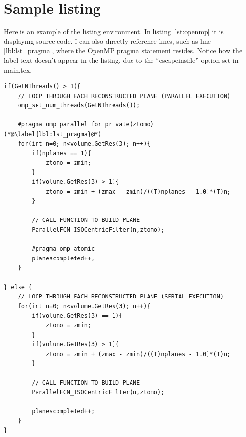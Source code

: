\documentclass[12pt, letterpaper]{article}
\begin{document}
\newpage
\section{Sample listing}

Here is an example of the listing environment.  In listing \ref{lst:openmp} it
is displaying source code.  I can also directly-reference lines, such as line
\ref{lbl:lst_pragma}, where the OpenMP pragma statement resides.  Notice how the
label text doesn't appear in the listing, due to the ``escapeinside'' option set
in main.tex.

\begin{lstlisting}[caption=Implementation of OpenMP in the reconstructioncode code,label=lst:openmp]
if(GetNThreads() > 1){
	// LOOP THROUGH EACH RECONSTRUCTED PLANE (PARALLEL EXECUTION)
	omp_set_num_threads(GetNThreads());

	#pragma omp parallel for private(ztomo) (*@\label{lbl:lst_pragma}@*)
	for(int n=0; n<volume.GetRes(3); n++){
		if(nplanes == 1){
			ztomo = zmin;
		}
		if(volume.GetRes(3) > 1){
			ztomo = zmin + (zmax - zmin)/((T)nplanes - 1.0)*(T)n;
		}

		// CALL FUNCTION TO BUILD PLANE
		ParallelFCN_ISOCentricFilter(n,ztomo);

		#pragma omp atomic
		planescompleted++;
	}

} else {
	// LOOP THROUGH EACH RECONSTRUCTED PLANE (SERIAL EXECUTION)
	for(int n=0; n<volume.GetRes(3); n++){
		if(volume.GetRes(3) == 1){
			ztomo = zmin;
		}
		if(volume.GetRes(3) > 1){
			ztomo = zmin + (zmax - zmin)/((T)nplanes - 1.0)*(T)n;
		}

		// CALL FUNCTION TO BUILD PLANE
		ParallelFCN_ISOCentricFilter(n,ztomo);

		planescompleted++;
	}
}
\end{lstlisting}



\appendix

\end{document}
